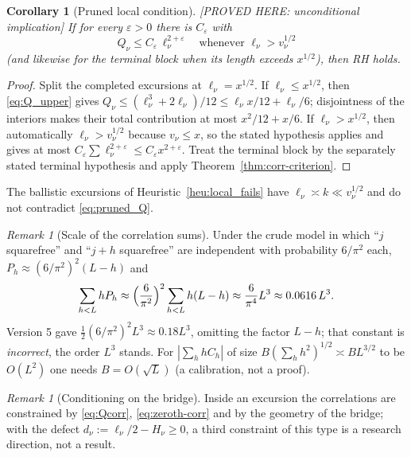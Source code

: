 \documentclass[11pt]{amsart}
\numberwithin{equation}{section}
\theoremstyle{plain}
\newtheorem{corollary}[theorem]{Corollary}
\theoremstyle{definition}
\theoremstyle{remark}
\newtheorem{remark}[theorem]{Remark}
\newcommand{\eps}{\varepsilon}
\begin{document}
\begin{corollary}[Pruned local condition]
\label{cor:pruned_local}
\emph{[PROVED HERE: unconditional implication]} If for every $\eps>0$ there is $C_\eps$
with
\begin{equation}
\label{eq:pruned_Q}
  Q_\nu\le C_\eps\,\ell_\nu^{2+\eps}\quad\text{whenever }\ell_\nu>v_\nu^{1/2}
\end{equation}
(and likewise for the terminal block when its length exceeds $x^{1/2}$),
then RH holds.
\end{corollary}

\begin{proof}
Split the completed excursions at $\ell_\nu=x^{1/2}$.  If
$\ell_\nu\le x^{1/2}$, then \eqref{eq:Q_upper} gives
$Q_\nu\le(\ell_\nu^3+2\ell_\nu)/12\le\ell_\nu x/12+\ell_\nu/6$; disjointness
of the interiors makes their total contribution at most $x^2/12+x/6$.
If $\ell_\nu>x^{1/2}$, then automatically
$\ell_\nu>v_\nu^{1/2}$ because $v_\nu\le x$, so the stated hypothesis
applies and gives at most $C_\eps\sum\ell_\nu^{2+\eps}\le C_\eps x^{2+\eps}$.
Treat the terminal block by the separately stated terminal hypothesis and
apply Theorem~\ref{thm:corr-criterion}.
\end{proof}

\noindent The ballistic excursions of Heuristic~\ref{heu:local_fails} have
$\ell_\nu\asymp k\ll v_\nu^{1/2}$ and do not contradict \eqref{eq:pruned_Q}.

\begin{remark}[Scale of the correlation sums]
\label{rem:chowla-scale}
Under the crude model in which ``$j$ squarefree'' and ``$j+h$ squarefree''
are independent with probability $6/\pi^2$ each,
$P_h\approx(6/\pi^2)^2(L-h)$ and
\begin{equation}
\label{eq:chowla_crude}
  \sum_{h<L}hP_h\approx\Bigl(\frac{6}{\pi^2}\Bigr)^2\sum_{h<L}h(L-h)
  \approx\frac{6}{\pi^4}L^3\approx0.0616\,L^3 .
\end{equation}
Version 5 gave $\tfrac12(6/\pi^2)^2L^3\approx0.18L^3$, omitting the factor
$L-h$; that constant is \emph{incorrect}, the order $L^3$ stands. For
$|\sum_hhC_h|$ of size $B(\sum_hh^2)^{1/2}\asymp BL^{3/2}$ to be $O(L^2)$ one
needs $B=O(\sqrt L)$ (a calibration, not a proof).
\end{remark}

\begin{remark}[Conditioning on the bridge]
\label{rem:conditioning}
Inside an excursion the correlations are constrained by
\eqref{eq:Qcorr}, \eqref{eq:zeroth-corr} and by the geometry of the bridge;
with the defect $d_\nu:=\ell_\nu/2-H_\nu\ge0$, a third constraint of this
type is a research direction, not a result.
\end{remark}
\end{document}
